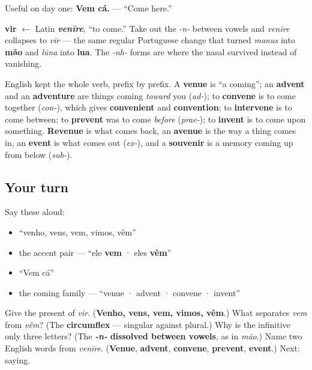 Useful on day one: \textbf{Vem cá.} — \textquotedblleft{}Come here.\textquotedblright{}

\begin{cousinweb}
\textbf{vir} $\leftarrow$ Latin \emph{\textbf{venīre}}, \textquotedblleft{}to come.\textquotedblright{} Take out the \emph{-n-} between vowels and \emph{venīre} collapses to \emph{vir} — the same regular Portuguese change that turned \emph{manus} into \textbf{mão} and \emph{lūna} into \textbf{lua}. The \emph{-nh-} forms are where the nasal survived instead of vanishing.

English kept the whole verb, prefix by prefix. A \textbf{venue} is \textquotedblleft{}a coming\textquotedblright{}; an \textbf{advent} and an \textbf{adventure} are things coming \emph{toward} you (\emph{ad-}); to \textbf{convene} is to come together (\emph{con-}), which gives \textbf{convenient} and \textbf{convention}; to \textbf{intervene} is to come between; to \textbf{prevent} was to come \emph{before} (\emph{prae-}); to \textbf{invent} is to come upon something. \textbf{Revenue} is what comes back, an \textbf{avenue} is the way a thing comes in, an \textbf{event} is what comes out (\emph{ex-}), and a \textbf{souvenir} is a memory coming up from below (\emph{sub-}).
\end{cousinweb}

\subsection*{Your turn}
Say these aloud:

\begin{itemize}
\raggedright
  \item \textquotedblleft{}venho, vens, vem, vimos, vêm\textquotedblright{}
  \item the accent pair — \textquotedblleft{}ele \textbf{vem} · eles \textbf{vêm}\textquotedblright{}
  \item \textquotedblleft{}Vem cá\textquotedblright{}
  \item the coming family — \textquotedblleft{}venue · advent · convene · invent\textquotedblright{}
\end{itemize}

\begin{tcolorbox}[breakable,colback=teal!4,colframe=teal!35!black,title={Before you move on}]
Give the present of \emph{vir}. (\textbf{Venho, vens, vem, vimos, vêm}.) What separates \emph{vem} from \emph{vêm}? (The \textbf{circumflex} — singular against plural.) Why is the infinitive only three letters? (The \emph{\textbf{-n-}} \textbf{dissolved between vowels}, as in \emph{mão}.) Name two English words from \emph{venīre}. (\textbf{Venue}, \textbf{advent}, \textbf{convene}, \textbf{prevent}, \textbf{event}.) Next: saying.
\end{tcolorbox}
